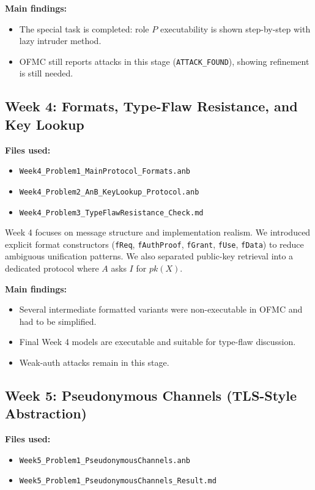 \documentclass[11pt,a4paper]{article}
\begin{document}
\textbf{Main findings:}
\begin{itemize}[leftmargin=1.2em]
  \item The special task is completed: role $P$ executability is shown step-by-step with lazy intruder method.
  \item OFMC still reports attacks in this stage (\texttt{ATTACK\_FOUND}), showing refinement is still needed.
\end{itemize}

\subsection{Week 4: Formats, Type-Flaw Resistance, and Key Lookup}

\textbf{Files used:}
\begin{itemize}[leftmargin=1.2em]
  \item \texttt{Week4\_Problem1\_MainProtocol\_Formats.anb}
  \item \texttt{Week4\_Problem2\_AnB\_KeyLookup\_Protocol.anb}
  \item \texttt{Week4\_Problem3\_TypeFlawResistance\_Check.md}
\end{itemize}

Week 4 focuses on message structure and implementation realism.
We introduced explicit format constructors
(\texttt{fReq}, \texttt{fAuthProof}, \texttt{fGrant}, \texttt{fUse}, \texttt{fData})
to reduce ambiguous unification patterns.
We also separated public-key retrieval into a dedicated protocol where $A$ asks $I$ for $pk(X)$.

\textbf{Main findings:}
\begin{itemize}[leftmargin=1.2em]
  \item Several intermediate formatted variants were non-executable in OFMC and had to be simplified.
  \item Final Week 4 models are executable and suitable for type-flaw discussion.
  \item Weak-auth attacks remain in this stage.
\end{itemize}

\subsection{Week 5: Pseudonymous Channels (TLS-Style Abstraction)}

\textbf{Files used:}
\begin{itemize}[leftmargin=1.2em]
  \item \texttt{Week5\_Problem1\_PseudonymousChannels.anb}
  \item \texttt{Week5\_Problem1\_PseudonymousChannels\_Result.md}
\end{itemize}
\end{document}
